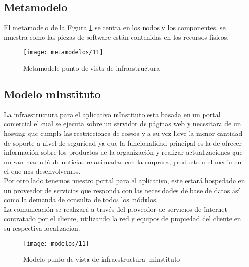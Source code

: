   \subsection{Metamodelo}
  El metamodelo de la Figura \ref{metamodelo11} se centra en los nodos y los componentes, se muestra como las piezas de software están contenidas en los recursos físicos.\cite{ref9}

  \begin{figure}[H]
	\centering
	\texttt{[image: metamodelos/11]}
	\captionsetup{width=.95\textwidth}
	\caption{Metamodelo punto de vista de infraestructura \cite{ref9}}
	\label{metamodelo11}
  \end{figure}

  \subsection{Modelo mInstituto}
  La infraestructura para el aplicativo mInstituto esta basada en un portal comercial el cual se ejecuta sobre un servidor de páginas web y necesitara de un hosting que cumpla las restricciones de costos y a su vez lleve la menor cantidad de soporte a nivel de seguridad ya que la funcionalidad principal es la de ofrecer información sobre los productos de la organización y realizar actualizaciones que no van mas allá de noticias relacionadas con la empresa, producto o el medio en el que nos desenvolvemos. \\
  
  Por otro lado tenemos nuestro portal para el aplicativo, este estará hospedado en un proveedor de servicios que responda con las necesidades de base de datos así como la demanda de consulta de todos los módulos.  \\
  
  La comunicación se realizará a través del proveedor de servicios de Internet contratado por el cliente, utilizando la red y equipos de propiedad del cliente en su respectiva localización. \\
  
  \begin{figure}[H]
	\centering
	\texttt{[image: modelos/11]}
 	\captionsetup{width=.95\textwidth}
	\caption{Modelo punto de vista de infraestructura: minstituto}
	\label{modelo11}
  \end{figure}
  
